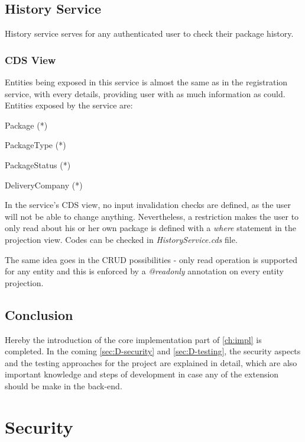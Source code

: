\subsection{History Service}
History service serves for any authenticated user to check their package history.

\subsubsection{CDS View}

Entities being exposed in this service is almost the same as in the registration service, with every details, providing user with as much information as could. Entities exposed by the service are:
\begin{compactenum}
	\item Package (*)
    \item PackageType (*)
    \item PackageStatus (*)
    \item DeliveryCompany (*)
\end{compactenum}

\bigskip
In the service's CDS view, no input invalidation checks are defined, as the user will not be able to change anything. Nevertheless, a restriction makes the user to only read about his or her own package is defined with a \textit{where} statement in the projection view. Codes can be checked in \textit{HistoryService.cds} file.

\bigskip
The same idea goes in the CRUD possibilities - only read operation is supported for any entity and this is enforced by a \textit{@readonly} annotation on every entity projection.

\subsection*{Conclusion}
Hereby the introduction of the core implementation part of \autoref{ch:impl} is completed.
In the coming \autoref{sec:D-security} and \autoref{sec:D-testing}, the security aspects and the testing approaches for the project are explained in detail, which are also important knowledge and steps of development in case any of the extension should be make in the back-end.

\section{Security}
\label{sec:D-security}

